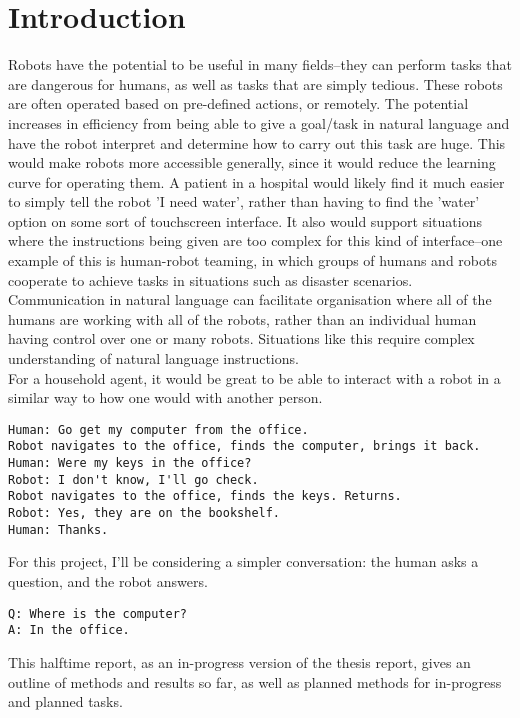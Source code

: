 \chapter{Introduction}
Robots have the potential to be useful in many fields–they can perform tasks that are dangerous for humans, as well as tasks that are simply tedious. These robots are often operated based on pre-defined actions, or remotely. The potential increases in efficiency from being able to give a goal/task in natural language and have the robot interpret and determine how to carry out this task are huge. This would make robots more accessible generally, since it would reduce the learning curve for operating them. A patient in a hospital would likely find it much easier to simply tell the robot 'I need water', rather than having to find the 'water' option on some sort of touchscreen interface. It also would support situations where the instructions being given are too complex for this kind of interface--one example of this is human-robot teaming, in which groups of humans and robots cooperate to achieve tasks in situations such as disaster scenarios\cite{Kruijff-Korbayova:2015aa}. Communication in natural language can facilitate organisation where all of the humans are working with all of the robots, rather than an individual human having control over one or many robots. Situations like this require complex understanding of natural language instructions. \\
For a household agent, it would be great to be able to interact with a robot in a similar way to how one would with another person. 
\begin{verbatim}
Human: Go get my computer from the office. 
Robot navigates to the office, finds the computer, brings it back. 
Human: Were my keys in the office?
Robot: I don't know, I'll go check. 
Robot navigates to the office, finds the keys. Returns.
Robot: Yes, they are on the bookshelf. 
Human: Thanks. 
\end{verbatim}
For this project, I'll be considering a simpler conversation: the human asks a question, and the robot answers. %
\begin{verbatim}
Q: Where is the computer?
A: In the office. 
\end{verbatim}

This halftime report, as an in-progress version of the thesis report, gives an outline of methods and results so far, as well as planned methods for in-progress and planned tasks. 
